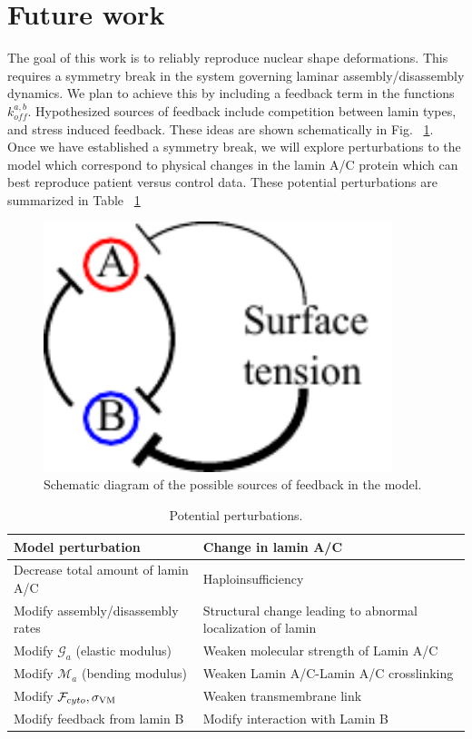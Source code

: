 \section{Future work} \label{sec:futurework}

The goal of this work is to reliably reproduce nuclear shape deformations. This requires a symmetry break in the system governing laminar assembly/disassembly dynamics. We plan to achieve this by including a feedback term in the functions $k_{off}^{a,b}$. Hypothesized sources of feedback include competition between lamin types, and stress induced feedback. These ideas are shown schematically in Fig. ~\ref{fig::feedback}. Once we have established a symmetry break, we will explore perturbations to the model which correspond to physical changes  in the lamin A/C protein which can best reproduce patient versus control data. These potential perturbations are summarized in Table ~\ref{tab:perturbations}


\begin{figure}[h]
\centering
\captionsetup{width=.9\linewidth}
\includegraphics[width=4in]{Project3/figs/feedback_stretch.pdf}
\caption{Schematic diagram of the possible sources of feedback in the model.}
\label{fig::feedback}
\end{figure}


\begin{table}[t!]
\caption{Potential perturbations.}\centering \label{tab:perturbations} 
\begin{tabular}{ l  l}
\hline
Model perturbation & Change in lamin A/C \\
\hline
Decrease total amount of lamin A/C  & Haploinsufficiency  \\
Modify assembly/disassembly rates & Structural change leading to abnormal localization of lamin\\
Modify $\mathcal{G}_a$ (elastic modulus) & Weaken molecular strength of Lamin A/C  \\
Modify $\mathcal{M}_a$ (bending modulus)& Weaken Lamin A/C-Lamin A/C crosslinking  \\
Modify $\mathcal{F}_{cyto}, \sigma_{\rm VM}$ & Weaken transmembrane link  \\
Modify feedback from lamin B &Modify interaction with Lamin B \\
\hline
\end{tabular}
\end{table}